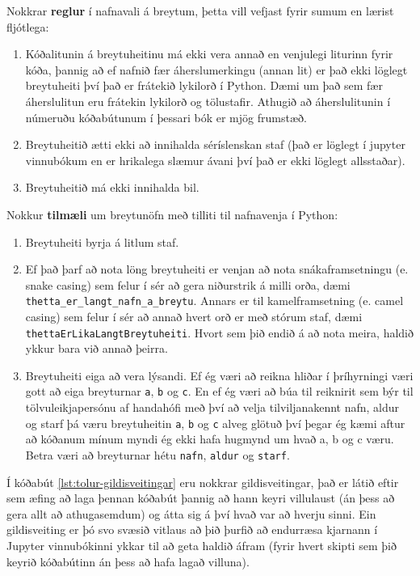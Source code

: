 Nokkrar \textbf{reglur} í nafnavali á breytum, þetta vill vefjast fyrir sumum en lærist fljótlega:
\vspace{0.3cm}
\begin{enumerate}
	\item Kóðalitunin á breytuheitinu má ekki vera annað en venjulegi liturinn fyrir kóða, þannig að ef nafnið fær áherslumerkingu (annan lit) er það ekki löglegt breytuheiti því það er frátekið lykilorð í Python. 
	Dæmi um það sem fær áherslulitun eru frátekin lykilorð og tölustafir.
	Athugið að áherslulitunin í númeruðu kóðabútunum í þessari bók er mjög frumstæð.
	\item Breytuheitið ætti ekki að innihalda séríslenskan staf (það er löglegt í jupyter vinnubókum en er hrikalega slæmur ávani því það er ekki löglegt allsstaðar).
	\item Breytuheitið má ekki innihalda bil.
\end{enumerate}
\vspace{0.3cm}
Nokkur \textbf{tilmæli} um breytunöfn með tilliti til nafnavenja í Python:
\vspace{0.3cm}
\begin{enumerate}
	\item Breytuheiti byrja á litlum staf.
	\item Ef það þarf að nota löng breytuheiti er venjan að nota snákaframsetningu (e. snake casing) sem felur í sér að gera niðurstrik á milli orða, dæmi \texttt{thetta\_er\_langt\_nafn\_a\_breytu}.
	Annars er til kamelframsetning (e. camel casing) sem felur í sér að annað hvert orð er með stórum staf, dæmi \texttt{thettaErLikaLangtBreytuheiti}.
	Hvort sem þið endið á að nota meira, haldið ykkur bara við annað þeirra.
	\item Breytuheiti eiga að vera lýsandi.
	Ef ég væri að reikna hliðar í þríhyrningi væri gott að eiga breyturnar \texttt{a}, \texttt{b} og \texttt{c}.
	En ef ég væri að búa til reiknirit sem býr til tölvuleikjapersónu af handahófi með því að velja tilviljanakennt nafn, aldur og starf þá væru breytuheitin \texttt{a}, \texttt{b} og \texttt{c} alveg glötuð því þegar ég kæmi aftur að kóðanum mínum myndi ég ekki hafa hugmynd um hvað a, b og c væru. 
	Betra væri að breyturnar hétu \texttt{nafn}, \texttt{aldur} og \texttt{starf}.
\end{enumerate}
\vspace{0.3cm}

Í kóðabút \ref{lst:tolur-gildisveitingar} eru nokkrar gildisveitingar, það er látið eftir sem æfing að laga þennan kóðabút þannig að hann keyri villulaust (án þess að gera allt að athugasemdum) og átta sig á því hvað var að hverju sinni.
Ein gildisveiting er þó svo svæsið vitlaus að þið þurfið að endurræsa kjarnann í Jupyter vinnubókinni ykkar til að geta haldið áfram (fyrir hvert skipti sem þið keyrið kóðabútinn án þess að hafa lagað villuna).

